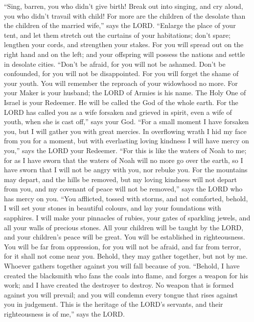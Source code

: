  ``Sing, barren, you who didn't give birth! Break out into
singing, and cry aloud, you who didn't travail with child! For more are
the children of the desolate than the children of the married wife,''
says the LORD.  ``Enlarge the place of your tent, and let
them stretch out the curtains of your habitations; don't spare; lengthen
your cords, and strengthen your stakes.  For you will
spread out on the right hand and on the left; and your offspring will
possess the nations and settle in desolate cities. 
``Don't be afraid, for you will not be ashamed. Don't be confounded, for
you will not be disappointed. For you will forget the shame of your
youth. You will remember the reproach of your widowhood no more.
 For your Maker is your husband; the LORD of Armies is his
name. The Holy One of Israel is your Redeemer. He will be called the God
of the whole earth.  For the LORD has called you as a wife
forsaken and grieved in spirit, even a wife of youth, when she is cast
off,'' says your God.  ``For a small moment I have
forsaken you, but I will gather you with great mercies. 
In overflowing wrath I hid my face from you for a moment, but with
everlasting loving kindness I will have mercy on you,'' says the LORD
your Redeemer.  ``For this is like the waters of Noah to
me; for as I have sworn that the waters of Noah will no more go over the
earth, so I have sworn that I will not be angry with you, nor rebuke
you.  For the mountains may depart, and the hills be
removed, but my loving kindness will not depart from you, and my
covenant of peace will not be removed,'' says the LORD who has mercy on
you.  ``You afflicted, tossed with storms, and not
comforted, behold, I will set your stones in beautiful colours, and lay
your foundations with sapphires.  I will make your
pinnacles of rubies, your gates of sparkling jewels, and all your walls
of precious stones.  All your children will be taught by
the LORD, and your children's peace will be great.  You
will be established in righteousness. You will be far from oppression,
for you will not be afraid, and far from terror, for it shall not come
near you.  Behold, they may gather together, but not by
me. Whoever gathers together against you will fall because of you.
 ``Behold, I have created the blacksmith who fans the
coals into flame, and forges a weapon for his work; and I have created
the destroyer to destroy.  No weapon that is formed
against you will prevail; and you will condemn every tongue that rises
against you in judgement. This is the heritage of the LORD's servants,
and their righteousness is of me,'' says the LORD.

